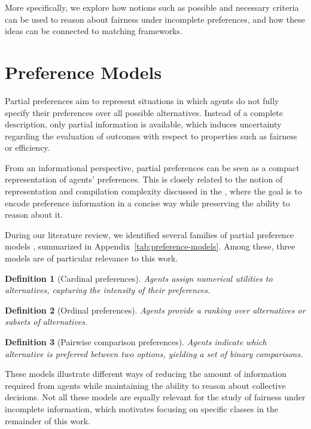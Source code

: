 \documentclass{article}
\newtheorem{definition}{Definition}
\begin{document}
More specifically, we explore how notions such as possible and necessary criteria can be used to reason about fairness under incomplete preferences, and how these ideas can be connected to matching frameworks.


\section{Preference Models}

Partial preferences aim to represent situations in which agents do not fully specify their preferences over all possible alternatives. 
Instead of a complete description, only partial information is available, which induces uncertainty regarding the evaluation of outcomes with respect to properties such as fairness or efficiency.

From an informational perspective, partial preferences can be seen as a compact representation of agents' preferences. 
This is closely related to the notion of representation and compilation complexity discussed in the \cite[Chapter 10, section 10.7]{brandt2016handbook}, where the goal is to encode preference information in a concise way while preserving the ability to reason about it.

During our literature review, we identified several families of partial preference models \citep[Chapter~10]{brandt2016handbook}, summarized in Appendix~\ref{tab:preference-models}. 
Among these, three models are of particular relevance to this work.

\begin{definition}[Cardinal preferences]
Agents assign numerical utilities to alternatives, capturing the intensity of their preferences.
\end{definition}

\begin{definition}[Ordinal preferences]
Agents provide a ranking over alternatives or subsets of alternatives.
\end{definition}

\begin{definition}[Pairwise comparison preferences]
Agents indicate which alternative is preferred between two options, yielding a set of binary comparisons.
\end{definition}

These models illustrate different ways of reducing the amount of information required from agents while maintaining the ability to reason about collective decisions. 
Not all these models are equally relevant for the study of fairness under incomplete information, which motivates focusing on specific classes in the remainder of this work.
\end{document}
